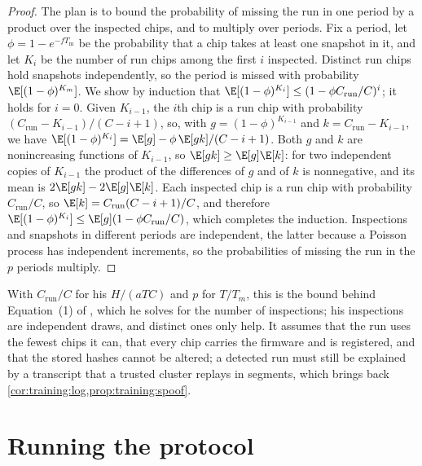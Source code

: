 \begin{refsection}
\begin{proof}
The plan is to bound the probability of missing the run in one period by a product over the inspected chips, and to multiply over periods. Fix a period, let $\phi=1-e^{-fT_{\mathrm m}}$ be the probability that a chip takes at least one snapshot in it, and let $K_i$ be the number of run chips among the first $i$ inspected. Distinct run chips hold snapshots independently, so the period is missed with probability $\E[(1-\phi)^{K_m}]$. We show by induction that $\E[(1-\phi)^{K_i}]\le(1-\phi C_{\mathrm{run}}/C)^i$; it holds for $i=0$. Given $K_{i-1}$, the $i$th chip is a run chip with probability $(C_{\mathrm{run}}-K_{i-1})/(C-i+1)$, so, with $g=(1-\phi)^{K_{i-1}}$ and $k=C_{\mathrm{run}}-K_{i-1}$, we have $\E[(1-\phi)^{K_i}]=\E[g]-\phi\,\E[gk]/(C-i+1)$. Both $g$ and $k$ are nonincreasing functions of $K_{i-1}$, so $\E[gk]\ge\E[g]\E[k]$: for two independent copies of $K_{i-1}$ the product of the differences of $g$ and of $k$ is nonnegative, and its mean is $2\E[gk]-2\E[g]\E[k]$. Each inspected chip is a run chip with probability $C_{\mathrm{run}}/C$, so $\E[k]=C_{\mathrm{run}}(C-i+1)/C$, and therefore $\E[(1-\phi)^{K_i}]\le\E[g](1-\phi C_{\mathrm{run}}/C)$, which completes the induction. Inspections and snapshots in different periods are independent, the latter because a Poisson process has independent increments, so the probabilities of missing the run in the $p$ periods multiply.
\end{proof}

With $C_{\mathrm{run}}/C$ for his $H/(aTC)$ and $p$ for $T/T_m$, this is the bound behind Equation~(1) of \textcite{Shavit2023}, which he solves for the number of inspections; his inspections are independent draws, and distinct ones only help. It assumes that the run uses the fewest chips it can, that every chip carries the firmware and is registered, and that the stored hashes cannot be altered; a detected run must still be explained by a transcript that a trusted cluster replays in segments, which brings back \cref{cor:training:log,prop:training:spoof}.

\section{Running the protocol}\label{sec:training:running}


\end{refsection}
